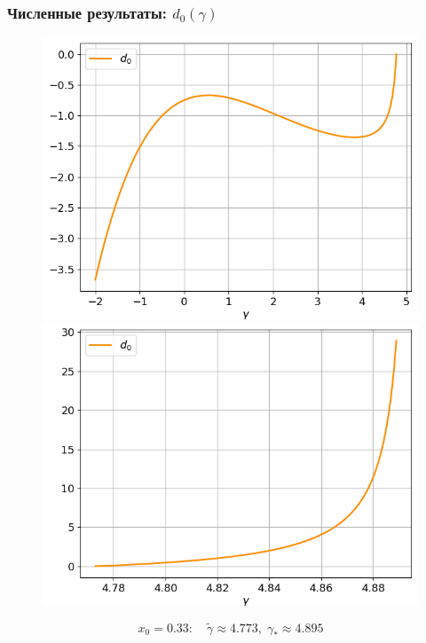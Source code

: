 \documentclass[fullscreen=true, unicode, bookmarks=false]{beamer}
\begin{document}
\begin{frame}
\frametitle{ Численные результаты: $ d_0(\gamma) $ }

\begin{figure} 
\includegraphics[scale=0.33]{divergent_d0_before_13.png}  
\hfill
\includegraphics[scale=0.33]{divergent_d0_after_13.png}  
\end{figure}

$$ x_0 = 0.33: \quad \tilde{\gamma} \approx 4.773, \; \gamma_* \approx 4.895 $$

\end{frame}
\end{document}
